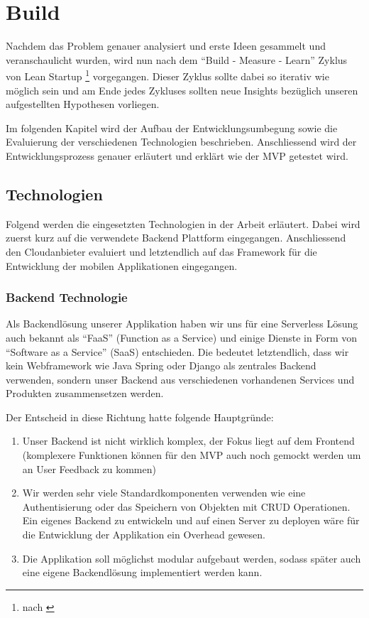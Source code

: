 \section{Build}
Nachdem das Problem genauer analysiert und erste Ideen gesammelt und veranschaulicht wurden, wird nun nach dem ``Build - Measure - Learn'' Zyklus von Lean Startup \footnote{nach \citet{ries2014lean}} vorgegangen. Dieser Zyklus sollte dabei so iterativ wie möglich sein und am Ende jedes Zykluses sollten neue Insights bezüglich unseren aufgestellten Hypothesen vorliegen.

Im folgenden Kapitel wird der Aufbau der Entwicklungsumbegung sowie die Evaluierung der verschiedenen Technologien beschrieben. Anschliessend wird der Entwicklungsprozess genauer erläutert und erklärt wie der MVP getestet wird.

\subsection{Technologien}
Folgend werden die eingesetzten Technologien in der Arbeit erläutert. Dabei wird zuerst kurz auf die verwendete Backend Plattform eingegangen. Anschliessend den Cloudanbieter evaluiert und letztendlich auf das Framework für die Entwicklung der mobilen Applikationen eingegangen.

\subsubsection{Backend Technologie}
Als Backendlösung unserer Applikation haben wir uns für eine Serverless Lösung auch bekannt als ``FaaS'' (Function as a Service) und einige Dienste in Form von ``Software as a Service'' (SaaS) entschieden. Die bedeutet letztendlich, dass wir kein Webframework wie Java Spring oder Django als zentrales Backend verwenden, sondern unser Backend aus verschiedenen vorhandenen Services und Produkten zusammensetzen werden.

Der Entscheid in diese Richtung hatte folgende Hauptgründe: 
\begin{enumerate}
    \item Unser Backend ist nicht wirklich komplex, der Fokus liegt auf dem Frontend (komplexere Funktionen können für den MVP auch noch gemockt werden um an User Feedback zu kommen)
    \item Wir werden sehr viele Standardkomponenten verwenden wie eine Authentisierung oder das Speichern von Objekten mit CRUD Operationen. Ein eigenes Backend zu entwickeln und auf einen Server zu deployen wäre für die Entwicklung der Applikation ein Overhead gewesen.
    \item Die Applikation soll möglichst modular aufgebaut werden, sodass später auch eine eigene Backendlösung implementiert werden kann.
\end{enumerate}


